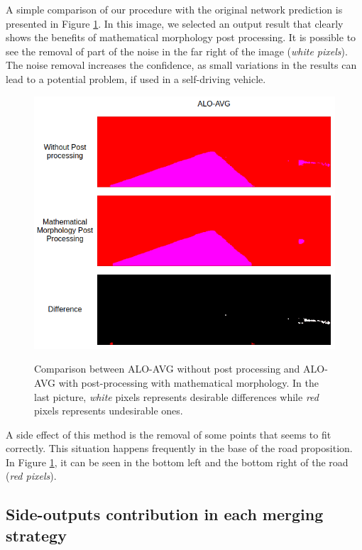 A simple comparison of our procedure with the original network prediction is presented in Figure \ref{fig:post_processing_comp}. In this image, we selected an output result that clearly shows the benefits of mathematical morphology post processing. It is possible to see the removal of part of the noise in the far right of the image (\textit{white pixels}). The noise removal increases the confidence, as small variations in the results can lead to a potential problem, if used in a self-driving vehicle. 

\begin{figure}
  \caption{Comparison between ALO-AVG without post processing and ALO-AVG with post-processing with mathematical morphology. In the last picture, \textit{white} pixels represents desirable differences while \textit{red} pixels represents undesirable ones.}
  \centering
  \includegraphics[width=1.\columnwidth]{figures/falreis/post_processing_comparison.png}
  \label{fig:post_processing_comp}
\end{figure}

A side effect of this method is the removal of some points that seems to fit correctly. This situation happens frequently in the base of the road proposition. In Figure \ref{fig:post_processing_comp}, it can be seen in the bottom left and the bottom right of the road (\textit{red pixels}).

\subsection{Side-outputs contribution in each merging strategy}
\label{ssec:merging_learn}

